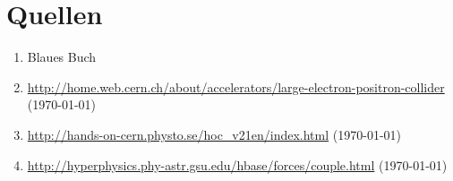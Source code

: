 \documentclass[a4paper,ngerman]{scrartcl}
\begin{document}
\section{Quellen}
\begin{enumerate}
\item Blaues Buch \label{ref:BB}
\item \url{http://home.web.cern.ch/about/accelerators/large-electron-positron-collider}
 (\today) \label{ref:cernlep}
\item \url{http://hands-on-cern.physto.se/hoc_v21en/index.html} (\today)\label{ref:hands-on}
\item \url{http://hyperphysics.phy-astr.gsu.edu/hbase/forces/couple.html} (\today) \label{ref:hyperphysics}
\end{enumerate}
\end{document}

